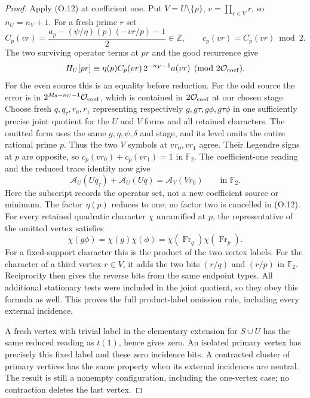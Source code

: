 \documentclass[11pt]{article}
\theoremstyle{definition}
\theoremstyle{remark}
\newcommand{\Z}{\mathbb Z}
\newcommand{\F}{\mathbb F}
\begin{document}
\begin{proof}
Apply (O.12) at coefficient one.  Put $V=U\setminus\{p\}$,
$v=\prod_{r\in V}r$, so $n_U=n_V+1$.  For a fresh prime $r$ set
\[
 C_p(vr)=\frac{a_p-(\psi/\eta)(p)(-vr/p)-1}{2}\in\Z,
 \qquad c_p(vr)=C_p(vr)\bmod2.
\]
The two surviving operator terms at $pr$ and the good recurrence give
\[
 H_U[pr]\equiv
   \eta(p)C_p(vr)\,2^{-n_V-1}a(vr)\pmod{2\mathcal O_{\rm coef}}.
\]
For the even source this is an equality before reduction.  For the
odd source the error is in $2^{M_\theta-n_U-1}\mathcal O_{\rm coef}$,
which is contained in $2\mathcal O_{\rm coef}$ at our chosen stage.
Choose fresh $q,q_\tau,r_0,r_1$ representing respectively
$g,g\tau,g\phi,g\tau\phi$ in one sufficiently precise joint quotient
for the $U$ and $V$ forms and all retained characters.
The omitted form uses the same $g,\eta,\psi,\delta$ and stage,
and its level omits the entire rational prime $p$.
Thus the two $V$ symbols at $vr_0,vr_1$ agree.  Their Legendre
signs at $p$ are opposite, so $c_p(vr_0)+c_p(vr_1)=1$ in $\F_2$.
The coefficient-one reading and the reduced trace identity now give
\[
             \mathcal A_U(Uq_\tau)+\mathcal A_U(Uq)=\mathcal A_V(Vr_0)\qquad\text{in }\F_2.
\]
Here the subscript records the operator set, not a new coefficient
source or minimum. The factor $\eta(p)$ reduces to one; no factor
two is cancelled in (O.12). For every retained quadratic character
$\chi$ unramified at $p$, the representative of the omitted vertex
satisfies
\[
 \chi(g\phi)=\chi(g)\chi(\phi)
            =\chi(\operatorname{Fr}_q)\chi(\operatorname{Fr}_p).
\]
For a fixed-support character this is the product of the two vertex
labels. For the character of a third vertex $r\in V$, it adds the
two bits $(r/q)$ and $(r/p)$ in $\F_2$. Reciprocity then gives the
reverse bits from the same endpoint types. All additional stationary
tests were included in the joint quotient, so they obey this formula
as well. This proves the full product-label omission rule, including
every external incidence.

A fresh vertex with trivial label in the elementary extension for
$S\cup U$ has the same reduced reading as $t(1)$, hence gives zero.
An isolated primary vertex has precisely this fixed label and these
zero incidence bits. A contracted cluster of primary vertices has
the same property when its external incidences are neutral. The
result is still a nonempty configuration, including the one-vertex
case; no contraction deletes the last vertex.


\end{proof}
\end{document}
